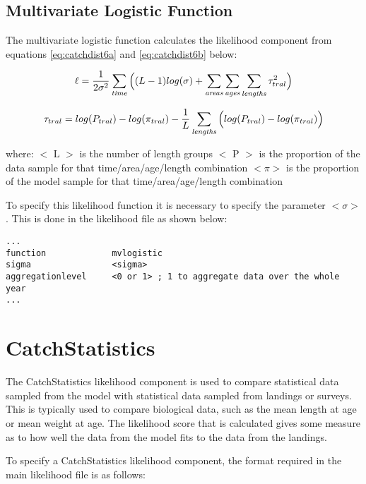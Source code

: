 \documentclass[]{book}
\begin{document}
\hypertarget{multivariate-logistic-function}{%
\subsection{Multivariate Logistic Function}\label{multivariate-logistic-function}}

The multivariate logistic function calculates the likelihood component
from equations
\eqref{eq:catchdist6a} and
\eqref{eq:catchdist6b} below:

\begin{equation}
\label{eq:catchdist6a}
\ell = \frac{1}{2\sigma^2} \sum_{\it time} \Big((L - 1) log(\sigma)+\sum_{\it areas}\sum_{\it ages}\sum_{\it lengths} \tau_{tral}^2 \Big)\end{equation}

\begin{equation}
\label{eq:catchdist6b}
\tau_{tral} = log(P_{tral}) - log(\pi_{tral}) - \frac{1}{L}\sum_{\it lengths} \Big(log(P_{tral}) - log(\pi_{tral}) \Big)\end{equation}

where: \(<\) L \(>\) is the number of length groups \(<\) P \(>\) is the
proportion of the data sample for that time/area/age/length combination
\(<\pi>\) is the proportion of the model sample for that
time/area/age/length combination

To specify this likelihood function it is necessary to specify the
parameter \(<\sigma>\). This is done in the likelihood file as shown
below:

\begin{verbatim}
...
function             mvlogistic
sigma                <sigma>
aggregationlevel     <0 or 1> ; 1 to aggregate data over the whole year
...
\end{verbatim}

\hypertarget{sec:catchstat}{%
\section{CatchStatistics}\label{sec:catchstat}}

The CatchStatistics likelihood component is used to compare statistical
data sampled from the model with statistical data sampled from landings
or surveys. This is typically used to compare biological data, such as
the mean length at age or mean weight at age. The likelihood score that
is calculated gives some measure as to how well the data from the model
fits to the data from the landings.

To specify a CatchStatistics likelihood component, the format required
in the main likelihood file is as follows:
\end{document}
